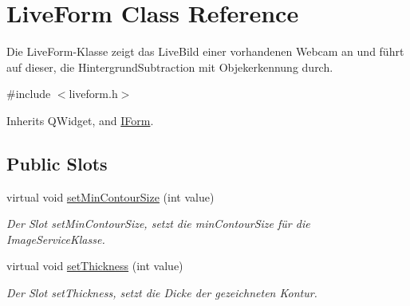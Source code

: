 \hypertarget{class_live_form}{}\section{Live\+Form Class Reference}
\label{class_live_form}


Die Live\+Form-\/\+Klasse zeigt das Live\+Bild einer vorhandenen Webcam an und führt auf dieser, die Hintergrund\+Subtraction mit Objekerkennung durch.  




{\ttfamily \#include $<$liveform.\+h$>$}



Inherits Q\+Widget, and \hyperlink{class_i_form}{I\+Form}.

\subsection*{Public Slots}
\begin{DoxyCompactItemize}
\item 
\hypertarget{class_live_form_a4bcb36bc471976ead250d4bff7c9adc1}{}virtual void \hyperlink{class_live_form_a4bcb36bc471976ead250d4bff7c9adc1}{set\+Min\+Contour\+Size} (int value)\label{class_live_form_a4bcb36bc471976ead250d4bff7c9adc1}

\begin{DoxyCompactList}\small\item\em Der Slot set\+Min\+Contour\+Size, setzt die min\+Contour\+Size für die Image\+Service\+Klasse. \end{DoxyCompactList}\item 
\hypertarget{class_live_form_a5fad0bfb6e8a94d1853870f5b78c9341}{}virtual void \hyperlink{class_live_form_a5fad0bfb6e8a94d1853870f5b78c9341}{set\+Thickness} (int value)\label{class_live_form_a5fad0bfb6e8a94d1853870f5b78c9341}

\begin{DoxyCompactList}\small\item\em Der Slot set\+Thickness, setzt die Dicke der gezeichneten Kontur. \end{DoxyCompactList}\end{DoxyCompactItemize}
